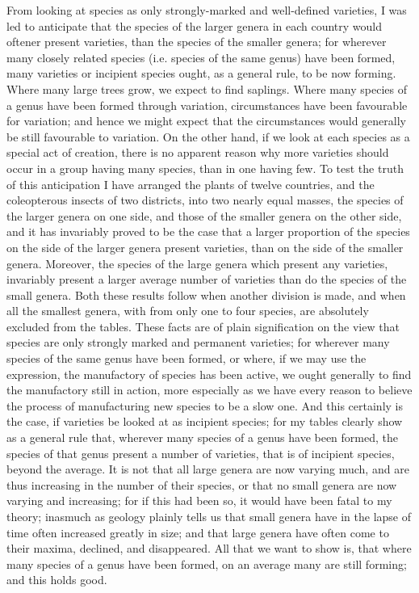 From looking at species as only strongly-marked and well-defined varieties, I was led to anticipate that the species of the larger genera in each country would oftener present varieties, than the species of the smaller genera; for wherever many closely related species (i.e. species of the same genus) have been formed, many varieties or incipient species ought, as a general rule, to be now forming. Where many large trees grow, we expect to find saplings. Where many species of a genus have been formed through variation, circumstances have been favourable for variation; and hence we might expect that the circumstances would generally be still favourable to variation. On the other hand, if we look at each species as a special act of creation, there is no apparent reason why more varieties should occur in a group having many species, than in one having few.
To test the truth of this anticipation I have arranged the plants of twelve countries, and the coleopterous insects of two districts, into two nearly equal masses, the species of the larger genera on one side, and those of the smaller genera on the other side, and it has invariably proved to be the case that a larger proportion of the species on the side of the larger genera present varieties, than on the side of the smaller genera. Moreover, the species of the large genera which present any varieties, invariably present a larger average number of varieties than do the species of the small genera. Both these results follow when another division is made, and when all the smallest genera, with from only one to four species, are absolutely excluded from the tables. These facts are of plain signification on the view that species are only strongly marked and permanent varieties; for wherever many species of the same genus have been formed, or where, if we may use the expression, the manufactory of species has been active, we ought generally to find the manufactory still in action, more especially as we have every reason to believe the process of manufacturing new species to be a slow one. And this certainly is the case, if varieties be looked at as incipient species; for my tables clearly show as a general rule that, wherever many species of a genus have been formed, the species of that genus present a number of varieties, that is of incipient species, beyond the average. It is not that all large genera are now varying much, and are thus increasing in the number of their species, or that no small genera are now varying and increasing; for if this had been so, it would have been fatal to my theory; inasmuch as geology plainly tells us that small genera have in the lapse of time often increased greatly in size; and that large genera have often come to their maxima, declined, and disappeared. All that we want to show is, that where many species of a genus have been formed, on an average many are still forming; and this holds good.
